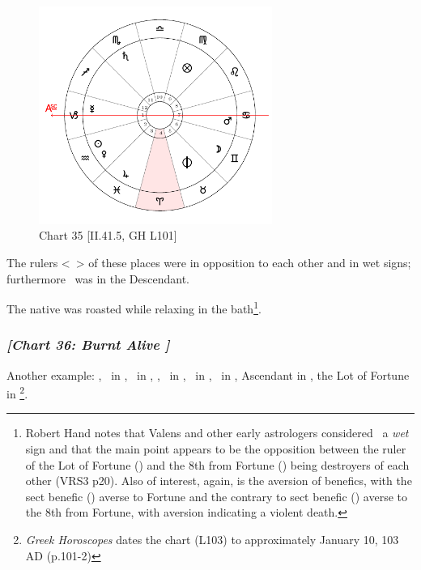 \clearpage
\begin{figure}
\centering
\vspace{-20pt}
\includegraphics[width=0.68\textwidth]{charts/2_41_5}
\caption{Chart 35 [II.41.5, GH L101]}
\label{fig:chart35}
\end{figure}

The rulers <\Mercury\, \Mars> of these places were in opposition to each other and in wet signs; furthermore \Mars\, was in the Descendant. 

The native was roasted while relaxing in the bath\footnote{Robert Hand notes that Valens and other early astrologers considered \Capricorn\, a \textsl{wet} sign and that the main point appears to be the opposition between the ruler of the Lot of Fortune (\Mercury) and the 8th from Fortune (\Mars) being destroyers of each other (VRS3 p20).  Also of interest, again, is the aversion of benefics, with the sect benefic (\Venus) averse to Fortune and the contrary to sect benefic (\Jupiter) averse to the 8th from Fortune, with aversion indicating a violent death.}. 
\newpage
\subsubsection{\textit{[Chart 36: Burnt Alive ]}}
Another example: \Sun, \Venus\, in \Capricorn, \Moon\, in \Cancer, \Saturn, \Mercury\, in \Sagittarius, \Jupiter\, in \Taurus, \Mars\, in \Leo, Ascendant in \Aquarius, the Lot of Fortune in \Leo
\footnote{\textit{Greek Horoscopes} dates the chart (L103) to approximately January 10, 103 AD (p.101-2)}.

